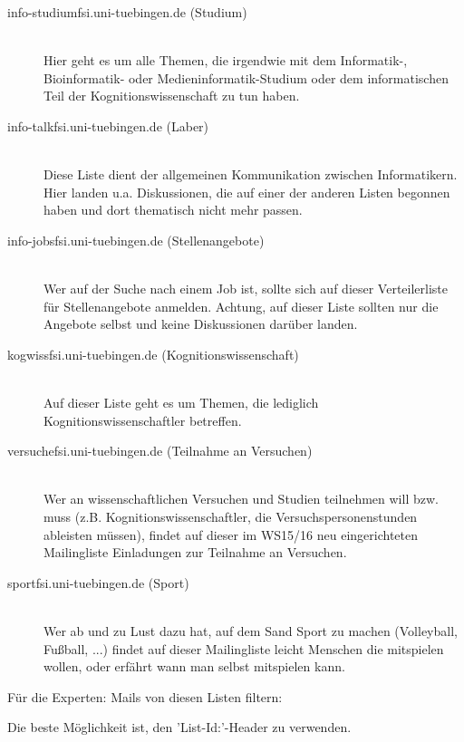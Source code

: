 \begin{description}

  \item[info-studium\At fsi.uni-tuebingen.de (Studium)] ~\\
    Hier geht es um alle Themen, die irgendwie mit dem Informatik-, Bioinformatik- oder Medieninformatik-Studium
    oder dem informatischen Teil der Kognitionswissenschaft zu tun haben. 


  \item[info-talk\At fsi.uni-tuebingen.de (Laber)] ~\\
    Diese Liste dient der allgemeinen Kommunikation zwischen Informatikern.
    Hier landen u.a. Diskussionen, die auf einer der anderen Listen begonnen
    haben und dort thematisch nicht mehr passen.


  \item[info-jobs\At fsi.uni-tuebingen.de (Stellenangebote)] ~\\
    Wer auf der Suche nach einem Job ist, sollte sich auf dieser Verteilerliste
    für Stellenangebote anmelden. Achtung, auf dieser Liste sollten nur die
    Angebote selbst und keine Diskussionen darüber landen.


	\pagebreak

  \item[kogwiss\At fsi.uni-tuebingen.de (Kognitionswissenschaft)] ~\\
    Auf dieser Liste geht es um Themen, die lediglich Kognitionswissenschaftler
    betreffen.

  
  \item[versuche\At fsi.uni-tuebingen.de (Teilnahme an Versuchen)] ~\\
    Wer an wissenschaftlichen Versuchen und Studien teilnehmen will bzw. muss (z.B. Kognitionswissenschaftler,
    die Versuchspersonenstunden ableisten müssen), findet auf dieser 
    im WS15/16 neu eingerichteten Mailingliste Einladungen zur Teilnahme an Versuchen.
  
    
  \item[sport\At fsi.uni-tuebingen.de (Sport)] ~\\
  	Wer ab und zu Lust dazu hat, auf dem Sand Sport zu machen (Volleyball, Fußball, ...) findet auf dieser Mailingliste leicht Menschen die mitspielen wollen, oder erfährt wann man selbst mitspielen kann.
  	

\end{description}

Für die Experten: Mails von diesen Listen filtern:

Die beste Möglichkeit ist, den 'List-Id:'-Header zu verwenden.

